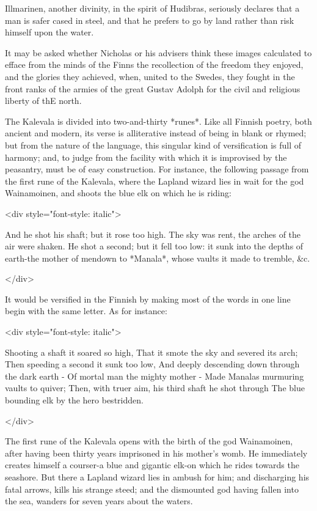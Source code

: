 \documentclass[11pt,a4paper]{article}
\begin{document}
Illmarinen, another divinity, in the spirit of Hudibras, seriously declares that a man is safer cased in steel, and that he prefers to go by land rather than risk himself upon the water.

It may be asked whether Nicholas or his advisers think these images calculated to efface from the minds of the Finns the recollection of the freedom they enjoyed, and the glories they achieved, when, united to the Swedes, they fought in the front ranks of the armies of the great Gustav Adolph for the civil and religious liberty of thE north.

The Kalevala is divided into two-and-thirty *runes*. Like all Finnish poetry, both ancient and modern, its verse is alliterative instead of being in blank or rhymed; but from the nature of the language, this singular kind of versification is full of harmony; and, to judge from the facility with which it is improvised by the peasantry, must be of easy construction. For instance, the following passage from the first rune of the Kalevala, where the Lapland wizard lies in wait for the god Wainamoinen, and shoots the blue elk on which he is riding:

<div style="font-style: italic">

And he shot his shaft; but it rose too high. The sky was rent, the arches of the air were shaken. He shot a second; but it fell too low: it sunk into the depths of earth-the mother of mendown to *Manala*, whose vaults it made to tremble, &c.

</div>

It would be versified in the Finnish by making most of the words in one line begin with the same letter. As for instance:

<div style="font-style: italic">

Shooting a shaft it soared so high,
That it smote the sky and severed its arch;
Then speeding a second it sunk too low,
And deeply descending down through the dark earth -
Of mortal man the mighty mother -
Made Manalas murmuring vaults to quiver;
Then, with truer aim, his third shaft he shot through 
The blue bounding elk by the hero bestridden.

</div>

The first rune of the Kalevala opens with the birth of the god Wainamoinen, after having been thirty years imprisoned in his mother's womb. He immediately creates himself a courser-a blue and gigantic elk-on which he rides towards the seashore. But there a Lapland wizard lies in ambush for him; and discharging his fatal arrows, kills his strange steed; and the dismounted god having fallen into the sea, wanders for seven years about the waters.
\end{document}
